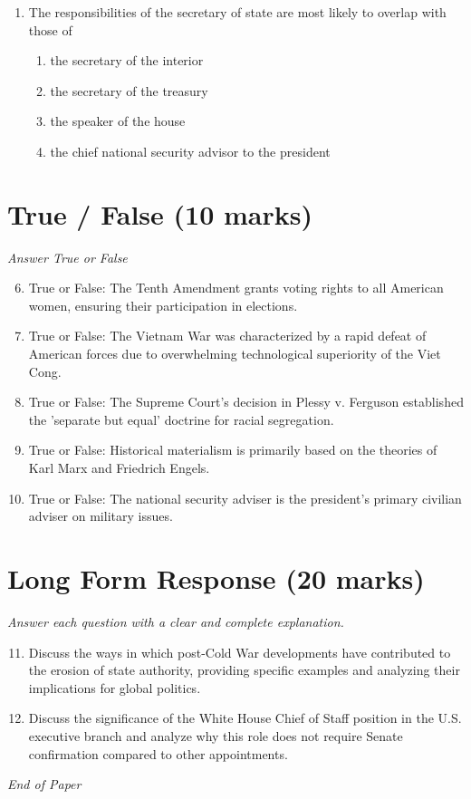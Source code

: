 \documentclass[12pt]{article}
\begin{document}
\begin{enumerate}[label=\arabic*.]
\begin{enumerate}[label=(\alph*)]
    \item Appoint Supreme Court justices
    \item Negotiate and ratify treaties
    \item Declare war
\end{enumerate}
\item The responsibilities of the secretary of state are most likely to overlap with those of
\begin{enumerate}[label=(\alph*)]
    \item the secretary of the interior
    \item the secretary of the treasury
    \item the speaker of the house
    \item the chief national security advisor to the president
\end{enumerate}
\end{enumerate}

\section*{True / False (10 marks)}
\textit{Answer True or False}
\begin{enumerate}[label=\arabic*.]
\setcounter{enumi}{5}
\item True or False: The Tenth Amendment grants voting rights to all American women, ensuring their participation in elections.
\item True or False: The Vietnam War was characterized by a rapid defeat of American forces due to overwhelming technological superiority of the Viet Cong.
\item True or False: The Supreme Court's decision in Plessy v. Ferguson established the 'separate but equal' doctrine for racial segregation.
\item True or False: Historical materialism is primarily based on the theories of Karl Marx and Friedrich Engels.
\item True or False: The national security adviser is the president's primary civilian adviser on military issues.
\end{enumerate}

\section*{Long Form Response (20 marks)}
\textit{Answer each question with a clear and complete explanation.}
\begin{enumerate}[label=\arabic*.]
\setcounter{enumi}{10}
\item Discuss the ways in which post-Cold War developments have contributed to the erosion of state authority, providing specific examples and analyzing their implications for global politics.
\item Discuss the significance of the White House Chief of Staff position in the U.S. executive branch and analyze why this role does not require Senate confirmation compared to other appointments.
\end{enumerate}

\vfill
\noindent\textit{End of Paper}
\end{document}
